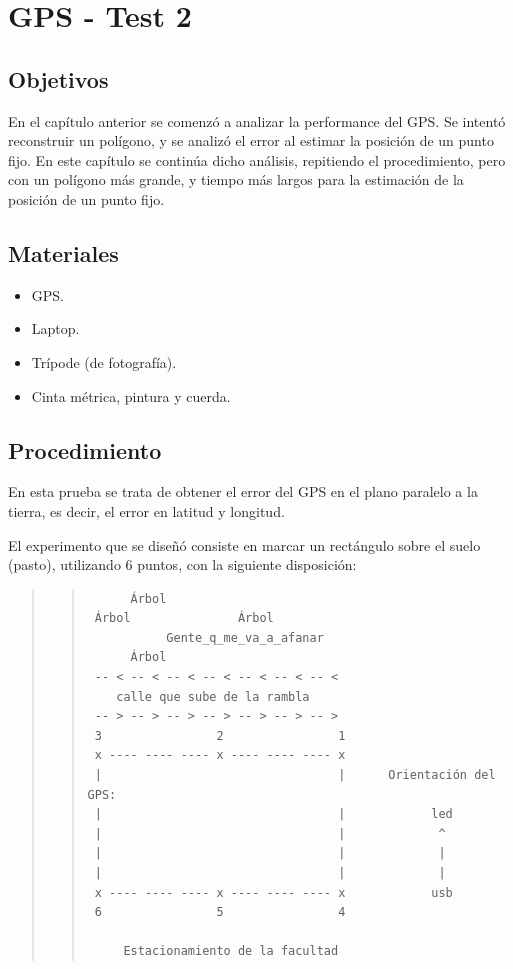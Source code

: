 \documentclass[spanish,12pt,a4paper,titlepage]{report}
\begin{document}
\chapter{GPS - Test 2}
\label{chap-gps-test-2}

\section{Objetivos}
\label{chap-gps-test-1}

En el capítulo anterior se comenzó a analizar la performance del GPS. Se intentó reconstruir un polígono, y se analizó el error al estimar la posición de un punto fijo. En este capítulo se continúa dicho análisis, repitiendo el procedimiento, pero con un polígono más grande, y tiempo más largos para la estimación de la posición de un punto fijo.

\section{Materiales}

\begin{itemize}
\item GPS.
\item Laptop.
\item Trípode (de fotografía).
\item Cinta métrica, pintura y cuerda.
\end{itemize}

\newpage
\section{Procedimiento}
\label{sec:gps2-procedimiento}

En esta prueba se trata de obtener el error del GPS en el plano paralelo a la tierra, es decir, el error en latitud y longitud.

El experimento que se diseñó consiste en marcar un rectángulo sobre el suelo (pasto), utilizando 6 puntos, con la siguiente disposición:

\begin{quote}
\begin{quote}
\begin{verbatim}
      Árbol              
 Árbol               Árbol
           Gente_q_me_va_a_afanar
      Árbol
 -- < -- < -- < -- < -- < -- < -- <
    calle que sube de la rambla
 -- > -- > -- > -- > -- > -- > -- > 
 3                2                1
 x ---- ---- ---- x ---- ---- ---- x
 |                                 |      Orientación del GPS:
 |                                 |            led
 |                                 |             ^
 |                                 |             |
 |                                 |             |
 x ---- ---- ---- x ---- ---- ---- x            usb
 6                5                4

     Estacionamiento de la facultad
\end{verbatim}
\end{quote}
\end{quote}
\end{document}
